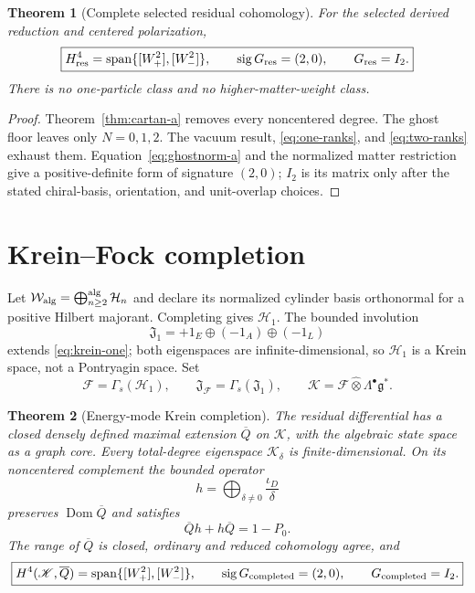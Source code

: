 \documentclass[11pt]{article}
\newtheorem{theorem}{Theorem}[section]
\theoremstyle{remark}
\newcommand{\g}{\mathfrak g}
\newcommand{\W}{\mathcal W}
\newcommand{\K}{\mathscr K}
\newcommand{\Hone}{\mathscr H_1}
\begin{document}
\begin{theorem}[Complete selected residual cohomology]\label{thm:main-a}
For the selected derived reduction and centered polarization,
\begin{equation}\label{eq:main-a}
 \boxed{
 H^4_{\rm res}
 =\operatorname{span}\{[W_+^2],[W_-^2]\},
 \qquad \operatorname{sig}G_{\rm res}=(2,0),
 \qquad G_{\rm res}=I_2.}
\end{equation}
There is no one-particle class and no higher-matter-weight class.
\end{theorem}

\begin{proof}
Theorem~\ref{thm:cartan-a} removes every noncentered degree.  The ghost floor
leaves only $N=0,1,2$.  The vacuum result, \eqref{eq:one-ranks}, and
\eqref{eq:two-ranks} exhaust them.  Equation~\eqref{eq:ghostnorm-a} and the
normalized matter restriction give a positive-definite form of signature
$(2,0)$; $I_2$ is its matrix only after the stated chiral-basis, orientation,
and unit-overlap choices.
\end{proof}

\section{Krein--Fock completion}

Let $\W_{\rm alg}=\bigoplus_{n\ge2}^{\rm alg}\mathcal H_n$ and declare its
normalized cylinder basis orthonormal for a positive Hilbert majorant.
Completing gives $\Hone$.  The bounded involution
\begin{equation}
 \mathfrak J_1=+1_E\oplus(-1_A)\oplus(-1_L)
\end{equation}
extends \eqref{eq:krein-one}; both eigenspaces are infinite-dimensional, so
$\Hone$ is a Krein space, not a Pontryagin space.  Set
\begin{equation}\label{eq:KreinFock}
 \mathscr F=\Gamma_s(\Hone),
 \qquad \mathfrak J_{\mathscr F}=\Gamma_s(\mathfrak J_1),
 \qquad \K=\mathscr F\widehat\otimes\Lambda^\bullet\g^*.
\end{equation}

\begin{theorem}[Energy-mode Krein completion]\label{thm:completion-a}
The residual differential has a closed densely defined maximal extension
$\overline Q$ on $\K$, with the algebraic state space as a graph core.  Every
total-degree eigenspace $\K_\delta$ is finite-dimensional.  On its
noncentered complement the bounded operator
\begin{equation}
 h=\bigoplus_{\delta\ne0}\frac{\iota_D}{\delta}
\end{equation}
preserves $\operatorname{Dom}\overline Q$ and satisfies
\begin{equation}
 \overline Qh+h\overline Q=1-P_0.
\end{equation}
The range of $\overline Q$ is closed, ordinary and reduced cohomology agree,
and
\begin{equation}\label{eq:completed-a}
 \boxed{
 H^4(\K,\overline Q)
 =\operatorname{span}\{[W_+^2],[W_-^2]\},
 \qquad \operatorname{sig}G_{\rm completed}=(2,0),
 \qquad G_{\rm completed}=I_2.}
\end{equation}
\end{theorem}
\end{document}
